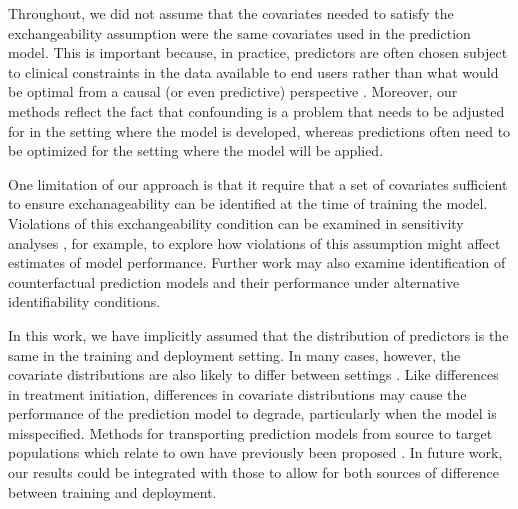 Throughout, we did not assume that the covariates needed to satisfy the exchangeability assumption were the same covariates used in the prediction model. This is important because, in practice,  predictors are often chosen subject to clinical constraints in the data available to end users rather than what would be optimal from a causal (or even predictive) perspective \cite{steyerberg_clinical_2019}. Moreover, our methods reflect the fact that confounding is a problem that needs to be adjusted for in the setting where the model is developed, whereas predictions often need to be optimized for the setting where the model will be applied. 

One limitation of our approach is that it require that a set of covariates sufficient to ensure exchanageability can be identified at the time of training the model. Violations of this exchangeability condition can be examined in sensitivity analyses \cite{robins_sensitivity_2000}, for example, to explore how violations of this assumption might affect estimates of model performance. Further work may also examine identification of counterfactual prediction models and their performance under alternative identifiability conditions.

In this work, we have implicitly assumed that the distribution of predictors is the same in the training and deployment setting. In many cases, however, the covariate distributions are also likely to differ between settings \cite{bickel_discriminative_2009, sugiyama_covariate_2007}. Like differences in treatment initiation, differences in covariate distributions may cause the performance of the prediction model to degrade, particularly when the model is misspecified. Methods for transporting prediction models from source to target populations which relate to own have previously been proposed \cite{sugiyama_covariate_2007,bickel_discriminative_2007,sugiyama2012machine, steingrimsson_transporting_2023, li_estimating_2022, morrison_robust_2022}. In future work,  our results could be integrated with those to allow for both sources of difference between training and deployment.

